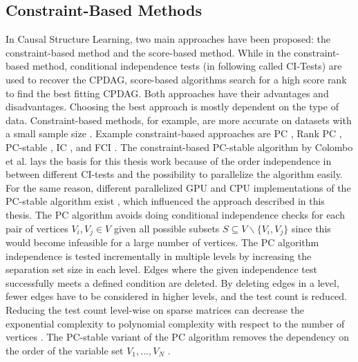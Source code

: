 \subsection{Constraint-Based Methods}
In Causal Structure Learning, two main approaches have been proposed: the constraint-based method and the score-based method. While in the constraint-based method, conditional independence tests (in following called CI-Tests) are used to recover the CPDAG, score-based algorithms search for a high score rank to find the best fitting CPDAG. Both approaches have their advantages and disadvantages. Choosing the best approach is mostly dependent on the type of data. Constraint-based methods, for example, are more accurate on datasets with a small sample size \cite{scutariBayesianNetworkConstraintBased2017}. Example constraint-based approaches are PC \cite{spirtesCausationPredictionSearch1993}, Rank PC \cite{harrisPCAlgorithmNonparanormal}, PC-stable \cite{colomboOrderIndependentConstraintBasedCausal}, IC \cite{vermaEquivalenceSynthesisCausal1990}, and FCI \cite{spirtesCausationPredictionSearch1993}.
The constraint-based PC-stable algorithm by Colombo et al. \cite{colomboOrderIndependentConstraintBasedCausal} lays the basis for this thesis work because of the order independence in between different CI-tests and the possibility to parallelize the algorithm easily. For the same reason, different parallelized GPU and CPU implementations of the PC-stable algorithm exist \cite{schmidtLoadBalancedParallelConstraintBased2019,schmidtOrderIndependentConstraintBasedCausal2018,zarebavaniCuPCCUDAbasedParallel2018}, which influenced the approach described in this thesis.
The PC algorithm avoids doing conditional independence checks for each pair of vertices $V_i, V_j \in V$ given all possible subsets $S \subseteq V \backslash \{V_i, V_j\}$ \cite{pearlTheoryInferredCausation1995} since this would become infeasible for a large number of vertices. The PC algorithm independence is tested incrementally in multiple levels by increasing the separation set size in each level. Edges where the given independence test successfully meets a defined condition are deleted. By deleting edges in a level, fewer edges have to be considered in higher levels, and the test count is reduced. Reducing the test count level-wise on sparse matrices can decrease the exponential complexity to polynomial complexity with respect to the number of vertices \cite{kalischEstimatingHighDimensionalDirected2007}.
The PC-stable variant of the PC algorithm removes the dependency on the order of the variable set $V_1, ...,V_N$ \cite{colomboOrderIndependentConstraintBasedCausal,schmidtOrderIndependentConstraintBasedCausal2018}.

